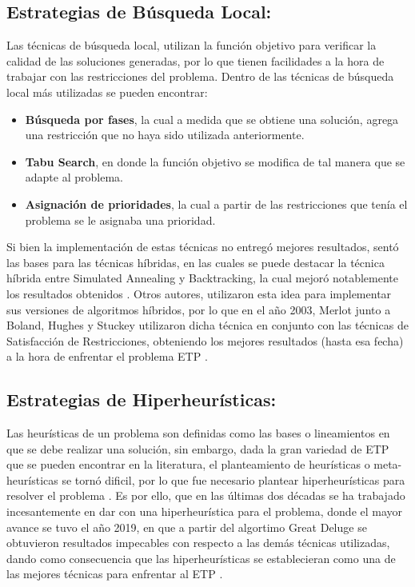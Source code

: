 \subsection{Estrategias de Búsqueda Local:}
Las técnicas de búsqueda local, utilizan la función objetivo para verificar la calidad de las soluciones generadas, por lo que tienen facilidades a la hora de trabajar con las restricciones del problema. Dentro de las técnicas de búsqueda local más utilizadas se pueden encontrar:
\begin{itemize}
    \item \textbf{Búsqueda por fases}, la cual a medida que se obtiene una solución, agrega una restricción que no haya sido utilizada anteriormente.
    \item \textbf{Tabu Search}, en donde la función objetivo se modifica de tal manera que se adapte al problema.
    \item \textbf{Asignación de prioridades}, la cual a partir de las restricciones que tenía el problema se le asignaba una prioridad.
\end{itemize}
Si bien la implementación de estas técnicas no entregó mejores resultados, sentó las bases para las técnicas híbridas, en las cuales se puede destacar la técnica híbrida entre Simulated Annealing y Backtracking, la cual mejoró notablemente los resultados obtenidos \cite{Cita18}. Otros autores, utilizaron esta idea para implementar sus versiones de algoritmos híbridos, por lo que en el año 2003, Merlot junto a Boland, Hughes y Stuckey utilizaron dicha técnica en conjunto con las técnicas de Satisfacción de Restricciones, obteniendo los mejores resultados (hasta esa fecha) a la hora de enfrentar el problema ETP \cite{Cita19}.

\subsection{Estrategias de Hiperheurísticas:}
Las heurísticas de un problema son definidas como las bases o lineamientos en que se debe realizar una solución, sin embargo, dada la gran variedad de ETP que se pueden encontrar en la literatura, el planteamiento de heurísticas o meta-heurísticas se tornó dificil, por lo que fue necesario plantear hiperheurísticas para resolver el problema \cite{Cita23}. Es por ello, que en las últimas dos décadas se ha trabajado incesantemente en dar con una hiperheurística para el problema, donde el mayor avance se tuvo el año 2019, en que a partir del algortimo Great Deluge se obtuvieron resultados impecables con respecto a las demás técnicas utilizadas, dando como consecuencia que las hiperheurísticas se establecieran como una de las mejores técnicas para enfrentar al ETP \cite{Cita1}.

